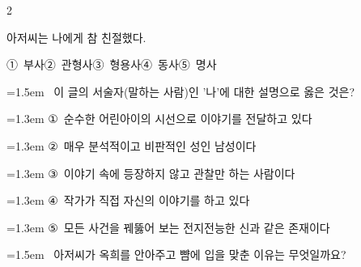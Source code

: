\documentclass[11pt, a4paper]{article}
\begin{document}
\begin{multicols}{2}
\begin{minipage}{\columnwidth}
\vspace{1mm}
\begin{boxibox}
아저씨는 나에게 참 친절했다. \\
\end{boxibox}
\vspace{1mm}

\vspace{0.5mm}
\noindent
\mbox{①~부사}\hspace{1em}\mbox{②~관형사}\hspace{1em}\mbox{③~형용사}\hspace{1em}\mbox{④~동사}\hspace{1em}\mbox{⑤~명사}

\vspace{4mm}
\end{minipage}
\par

\noindent\begin{minipage}{\columnwidth}
\vspace{2mm}
{\hangindent=1.5em  ~이 글의 서술자(말하는 사람)인 '나'에 대한 설명으로 옳은 것은?\par}

\vspace{0.5mm}
{\hangindent=1.3em  \noindent\hspace{0.3em}①~순수한 어린아이의 시선으로 이야기를 전달하고 있다\par}
{\hangindent=1.3em  \noindent\hspace{0.3em}②~매우 분석적이고 비판적인 성인 남성이다\par}
{\hangindent=1.3em  \noindent\hspace{0.3em}③~이야기 속에 등장하지 않고 관찰만 하는 사람이다\par}
{\hangindent=1.3em  \noindent\hspace{0.3em}④~작가가 직접 자신의 이야기를 하고 있다\par}
{\hangindent=1.3em  \noindent\hspace{0.3em}⑤~모든 사건을 꿰뚫어 보는 전지전능한 신과 같은 존재이다\par}
\vspace{4mm}
\end{minipage}
\par

\noindent\begin{minipage}{\columnwidth}
\vspace{2mm}
{\hangindent=1.5em  ~아저씨가 옥희를 안아주고 뺨에 입을 맞춘 이유는 무엇일까요?\par}


\end{minipage}
\end{multicols}
\end{document}
